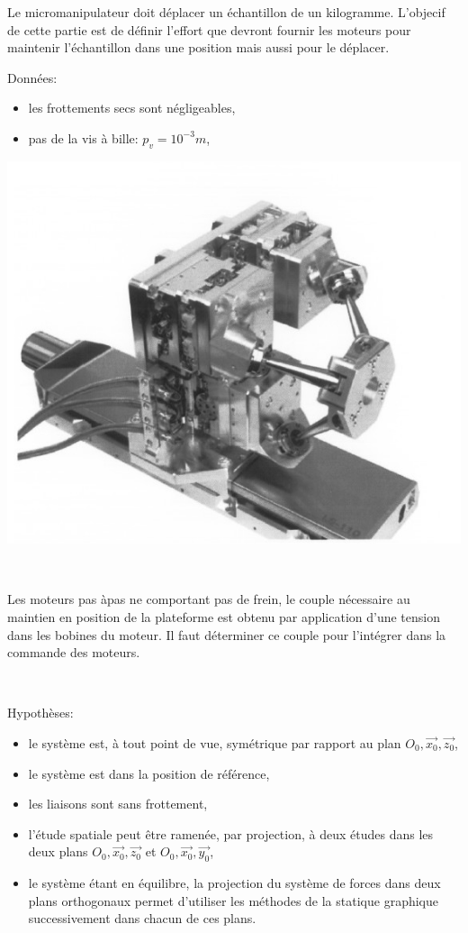 \begin{minipage}{0.6\linewidth}
Le micromanipulateur doit déplacer un échantillon de un kilogramme. L'objecif de cette partie est de définir l'effort que devront fournir les moteurs pour maintenir l'échantillon dans une position mais aussi pour le déplacer.

Données:
\begin{itemize}
 \item les frottements secs sont négligeables,
 \item pas de la vis à bille: $p_v=10^{-3}m$,
\end{itemize}
\end{minipage}
\hfill
\begin{minipage}{0.37\linewidth}
\centering\includegraphics[width=0.9\linewidth]{img/Micro.jpg}
\end{minipage}

~\

Les moteurs pas àpas ne comportant pas de frein, le couple nécessaire au maintien en position de la plateforme est obtenu par application d'une tension dans les bobines du moteur. Il faut déterminer ce couple pour l'intégrer dans la commande des moteurs.

~\

Hypothèses:
\begin{itemize}
 \item le système est, à tout point de vue, symétrique par rapport au plan $O_0,\overrightarrow{x_0},\overrightarrow{z_0}$,
 \item le système est dans la position de référence,
 \item les liaisons sont sans frottement,
 \item l'étude spatiale peut être ramenée, par projection, à deux études dans les deux plans $O_0,\overrightarrow{x_0},\overrightarrow{z_0}$ et $O_0,\overrightarrow{x_0},\overrightarrow{y_0}$,
 \item le système étant en équilibre, la projection du système de forces dans deux plans orthogonaux permet d'utiliser les méthodes de la statique graphique successivement dans chacun de ces plans.
\end{itemize}


